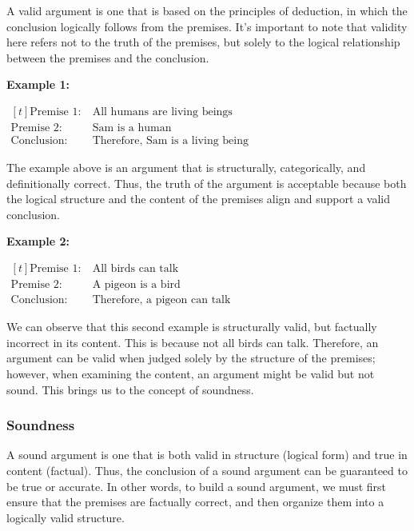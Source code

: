 \documentclass[12pt,a4paper,openany]{article}
\begin{document}
A valid argument is one that is based on the principles of deduction, in
which the conclusion logically follows from the premises. It's important
to note that validity here refers not to the truth of the premises, but
solely to the logical relationship between the premises and the
conclusion.

\textbf{Example 1:}

\noindent
\(
\begin{aligned}[t]
\text{Premise 1:} \ & \text{All humans are living beings} \\
\text{Premise 2:} \ & \text{Sam is a human} \\
\text{Conclusion:} \ & \text{Therefore, Sam is a living being}
\end{aligned}
\)

The example above is an argument that is structurally, categorically,
and definitionally correct. Thus, the truth of the argument is
acceptable because both the logical structure and the content of the
premises align and support a valid conclusion.

\textbf{Example 2:}

\noindent
\(
\begin{aligned}[t]
\text{Premise 1:} \ & \text{All birds can talk} \\
\text{Premise 2:} \ & \text{A pigeon is a bird} \\
\text{Conclusion:} \ & \text{Therefore, a pigeon can talk}
\end{aligned}
\)

We can observe that this second example is structurally valid, but
factually incorrect in its content. This is because not all birds can
talk. Therefore, an argument can be valid when judged solely by the
structure of the premises; however, when examining the content, an
argument might be valid but not sound. This brings us to the concept of
soundness.

\subsubsection{Soundness}\label{soundness}

A sound argument is one that is both valid in structure (logical form)
and true in content (factual). Thus, the conclusion of a sound argument
can be guaranteed to be true or accurate. In other words, to build a
sound argument, we must first ensure that the premises are factually
correct, and then organize them into a logically valid structure.
\end{document}

